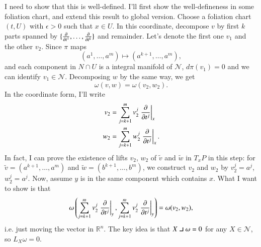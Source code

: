 \documentclass[a4paper, 12pt]{article}
\theoremstyle{Mydefinition}
\theoremstyle{Mytheorem}
\newcommand{\intprodl}{%
    \mathbin{\scalebox{1.5}{$\lrcorner$}}%
}
\begin{document}
\begin{enumerate}
    I need to show that this is well-defined. I'll first show the well-defineness in some foliation chart, and extend this result to global version. Choose a foliation chart $(t,U)$ with $\epsilon>0$ such that $x\in U$. In this coordinate, decompose $v$ by first $k$ parts spanned by $\{\pdv{t^1}, \ldots, \pdv{t^k}\}$ and remainder. Let's denote the first one $v_1$ and the other $v_2$. Since $\pi$ maps
    \begin{equation*}
        (a^1, \ldots ,a^m)\mapsto (a^{k+1}, \ldots, a^m),
    \end{equation*}
    and each component in $N\cap U$ is a integral manifold of $\mathcal{N}$, $d\pi(v_1) = 0$ and we can identify $v_1\in \mathcal{N}$. Decomposing $w$ by the same way, we get
    \begin{equation*}
        \omega(v,w) = \omega(v_2,w_2).
    \end{equation*}
    In the coordinate form, I'll write
    \begin{equation*}
        \begin{split}
            v_2 &= \sum_{j=k+1}^m v^j_2\left.\pdv{t^j}\right|_{x}\\
            w_2 &= \sum_{j=k+1}^m w^j_2\left.\pdv{t^j}\right|_{x}.
        \end{split}
    \end{equation*}
    In fact, I can prove the existence of lifts $v_2$, $w_2$ of $\tilde{v}$ and $\tilde{w}$ in $T_xP$ in this step: for $\tilde{v} = (a^{k+1}, \ldots, a^m)$ and $\tilde{w} = (b^{k+1}, \ldots, b^m)$, we construct $v_2$ and $w_2$ by $v^j_2 = a^j$, $w^j_2 = a^j$. Now, assume $y$ is in the same component which contains $x$. What I want to show is that
    \begin{equation*}
        \omega\left(\sum_{j=k+1}^m v^j_2\left.\pdv{t^j}\right|_{y}, \sum_{j=k+1}^m v^j_2\left.\pdv{t^j}\right|_{y}\right) = \omega(v_2, w_2),
    \end{equation*}
    i.e. just moving the vector in $\mathbb{R}^n$. The key idea is that $X\intprodl \omega = 0$ for any $X\in \mathcal{N}$, so $L_X\omega = 0$.
    

\end{enumerate}
\end{document}
